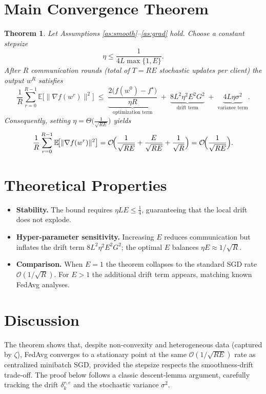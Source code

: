 \documentclass{article}
\newtheorem{theorem}{Theorem}
\newcommand{\EE}{\mathbb{E}}
\begin{document}
\section*{Main Convergence Theorem}
\begin{theorem}\label{thm:main}
Let Assumptions \ref{as:smooth}–\ref{as:grad} hold.  
Choose a constant stepsize 
\[
\eta\le \frac{1}{4L\max\{1,E\}} .
\]
After $R$ communication rounds (total of $T=RE$ stochastic updates per client) the output $w^{R}$ satisfies
\[
\frac1R\sum_{r=0}^{R-1}\EE\!\bigl[\|\nabla f(w^{r})\|^2\bigr]
\;\le\;
\underbrace{\frac{2\bigl(f(w^{0})-f^\star\bigr)}{\eta R}}_{\text{optimization term}}
\;+\;
\underbrace{8L^2\eta^2 E^2 G^2}_{\text{drift term}}
\;+\;
\underbrace{4L\eta\sigma^2}_{\text{variance term}} .
\]
Consequently, setting $\eta = \Theta\!\bigl(\tfrac{1}{\sqrt{RE}}\bigr)$ yields
\[
\frac1R\sum_{r=0}^{R-1}\EE\!\bigl[\|\nabla f(w^{r})\|^2\bigr]=
\mathcal{O}\!\Bigl(\frac{1}{\sqrt{RE}}+\frac{E}{\sqrt{RE}}+\frac{1}{\sqrt{R}}\Bigr)
= \mathcal{O}\!\Bigl(\frac{1}{\sqrt{RE}}\Bigr).
\]
\end{theorem}

\section*{Theoretical Properties}
\begin{itemize}
\item \textbf{Stability.} The bound requires $\eta L E\le \tfrac14$, guaranteeing that the local drift does not explode.
\item \textbf{Hyper‑parameter sensitivity.} Increasing $E$ reduces communication but inflates the drift term $8L^2\eta^2E^2G^2$; the optimal $E$ balances $\eta E\approx 1/\sqrt{R}$.
\item \textbf{Comparison.} When $E=1$ the theorem collapses to the standard SGD rate $\mathcal{O}(1/\sqrt{R})$. For $E>1$ the additional drift term appears, matching known FedAvg analyses.
\end{itemize}

\section*{Discussion}
The theorem shows that, despite non‑convexity and heterogeneous data (captured by $\zeta$), FedAvg converges to a stationary point at the same $\mathcal{O}(1/\sqrt{RE})$ rate as centralized minibatch SGD, provided the stepsize respects the smoothness‑drift trade‑off. The proof below follows a classic descent‑lemma argument, carefully tracking the drift $\delta_{k}^{r,e}$ and the stochastic variance $\sigma^2$.
\end{document}
